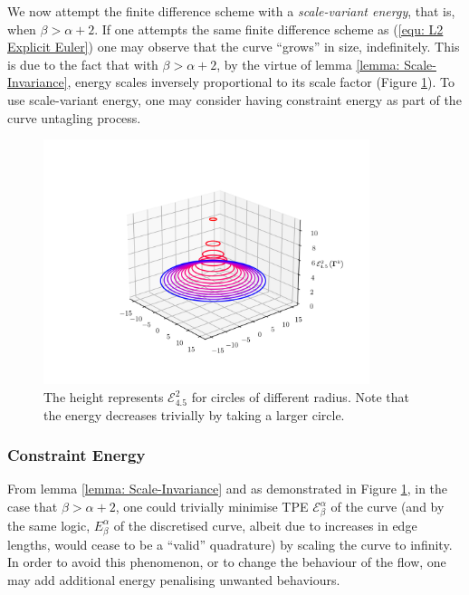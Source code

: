 \documentclass[../dissertation.tex]{subfiles}
\begin{document}
We now attempt the finite difference scheme with a \textit{scale-variant energy}, that is, when $\beta > \alpha + 2$. 
If one attempts the same finite difference scheme as (\ref{equ: L2 Explicit Euler})
one may observe that the curve ``grows'' in size, indefinitely.
This is due to the fact that with $\beta > \alpha + 2$,
by the virtue of lemma \ref{lemma: Scale-Invariance},
energy scales inversely proportional to its scale factor
(Figure \ref{fig: Scale Variant}).
To use scale-variant energy, one may consider having constraint energy as part of the curve untagling process.
\begin{figure}[tbp]
    \centering
    \includegraphics[width=0.85\textwidth]{sections/unknottingCurveImgs/scaleVariant}
    \caption{The height represents $\mathcal{E}_{4.5}^{2}$ for circles of different radius. Note that the energy decreases trivially by taking a larger circle.}
    \label{fig: Scale Variant}
\end{figure}
\subsubsection{Constraint Energy}
\label{sct: Constraint Energy}
From lemma \ref{lemma: Scale-Invariance} and as demonstrated in Figure \ref{fig: Scale Variant}, in the case that $\beta > \alpha + 2$,
one could trivially minimise TPE $\mathcal{E}_{\beta}^{\alpha}$ of the curve 
(and by the same logic, $E_{\beta}^{\alpha}$ of the discretised curve, albeit due to increases in edge lengths, would cease to be a ``valid'' quadrature)
by scaling the curve to infinity.
In order to avoid this phenomenon, or to change the behaviour of the flow, one may add additional energy penalising unwanted behaviours.
\end{document}
